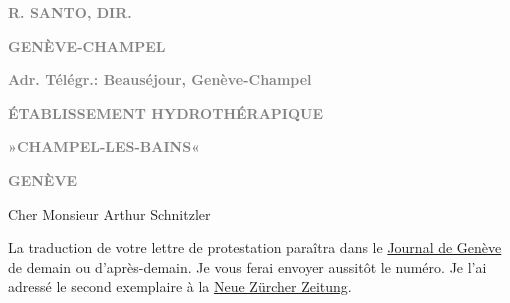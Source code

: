 \pstart
           \begin{otherlanguage}{french}\textcolor{gray}{\textbf{R. SANTO, DIR.}}\end{otherlanguage}\pend
           
\pstart
           \begin{otherlanguage}{french}\textcolor{gray}{\textbf{\textbf{GENÈVE-CHAMPEL}}}\end{otherlanguage}\pend
           
\pstart
           \begin{otherlanguage}{french}\textcolor{gray}{\textbf{Adr. Télégr.: Beauséjour, Genève-Champel}}\end{otherlanguage}\pend
           
\pstart
           \begin{otherlanguage}{french}\textcolor{gray}{\textbf{ÉTABLISSEMENT HYDROTHÉRAPIQUE}}\end{otherlanguage}\pend
           
\pstart
           \begin{otherlanguage}{french}\textcolor{gray}{\textbf{»CHAMPEL-LES-BAINS«}}\end{otherlanguage}\pend
           
\pstart
           \begin{otherlanguage}{french}\textcolor{gray}{\textbf{\textbf{GENÈVE}}}\end{otherlanguage}\pend
           
\pstart{}Cher Monsieur Arthur Schnitzler\pend\vspace{0.5em}
\pstart
           \begin{otherlanguage}{french}La traduction de votre lettre
                     de protestation paraîtra dans le \uline{Journal de Genève} de demain ou d’après-demain. Je vous ferai envoyer aussitôt le numéro. Je
                  l’ai adressé le second exemplaire à la \uline{Neue Zürcher Zeitung}.\end{otherlanguage}\pend
           
